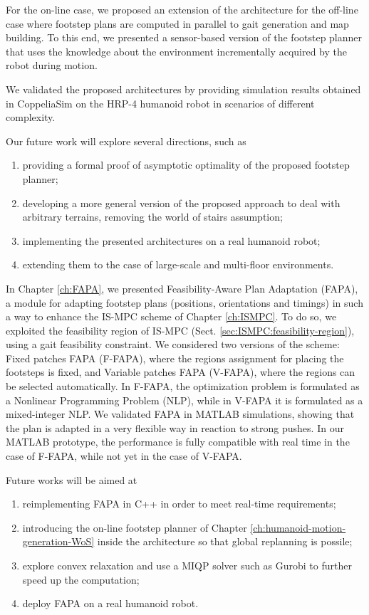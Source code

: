 For the on-line case, we proposed an extension of the architecture for the
off-line case where footstep plans are computed in parallel to gait generation
and map building.
To this end, we presented a sensor-based version of the footstep planner that
uses the knowledge about the environment incrementally acquired by the robot
during motion.

We validated the proposed architectures by providing simulation results
obtained in CoppeliaSim on the HRP-4 humanoid robot in scenarios of different
complexity.

Our future work will explore several directions, such as
\begin{enumerate}
    \item providing a formal proof of asymptotic optimality of the proposed
        footstep planner;
    \item developing a more general version of the proposed approach to deal
        with arbitrary terrains, removing the world of stairs assumption;
    \item implementing the presented architectures on a real humanoid robot;
    \item extending them to the case of large-scale and multi-floor environments.
\end{enumerate}

\medskip

In Chapter \ref{ch:FAPA}, we presented Feasibility-Aware Plan Adaptation (FAPA),
a module for adapting footstep plans (positions, orientations and timings) in
such a way to enhance the IS-MPC scheme of Chapter \ref{ch:ISMPC}. To do so,
we exploited the feasibility region of IS-MPC (Sect.
\ref{sec:ISMPC:feasibility-region}), using a gait feasibility constraint.
We considered two versions of the scheme:
Fixed patches FAPA (F-FAPA), where the regions assignment for placing the footsteps is 
fixed, and Variable patches FAPA (V-FAPA), where the regions can be selected
automatically. In F-FAPA, the optimization problem is formulated as a Nonlinear
Programming Problem (NLP), while in V-FAPA it is formulated as a mixed-integer 
NLP. We validated FAPA in MATLAB simulations, showing that the plan is adapted in a very
flexible way in reaction to strong pushes. In our MATLAB prototype,
the performance is fully compatible with real time in the case of F-FAPA,
while not yet in the case of V-FAPA.

Future works will be aimed at
\begin{enumerate}
    \item reimplementing FAPA in C++ in order to meet real-time requirements;
    \item introducing the on-line footstep planner of Chapter
        \ref{ch:humanoid-motion-generation-WoS}
        inside the architecture so that global replanning is possile;
    \item explore convex relaxation \cite{Marcucci2024ShortestPathsinGraphofConvexSets}
        and use a MIQP solver such as Gurobi \cite{GurobiOptimizerReferenceManual}
        to further speed up the computation;
    \item deploy FAPA on a real humanoid robot.
\end{enumerate}

